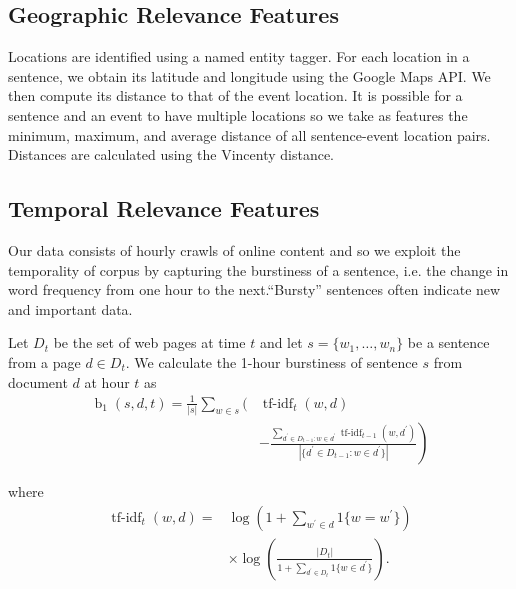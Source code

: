 \documentclass{sig-alternate} \usepackage{url} \usepackage{color}
\begin{document}

\subsection{Geographic Relevance Features}

Locations are identified using a named entity tagger. For each location in a
sentence, we obtain its latitude and longitude using the Google Maps API.  We
then compute its distance to that of the event location.  It is possible for a
sentence and an event to have multiple locations so we take as features the
minimum, maximum, and average distance of all sentence-event location pairs.
Distances are calculated using the Vincenty distance.

\subsection{Temporal Relevance Features}

Our data consists of hourly crawls of online content and so we exploit the
temporality of corpus by capturing the burstiness of a sentence, i.e.  the
change in word frequency from one hour to the next.``Bursty'' sentences often
indicate new and important data. 

Let $D_t$ be the set of web pages at time $t$ and let $s = \{w_1,\ldots,
w_n\}$ be a sentence from a page $d \in D_t$.  We calculate the 1-hour
burstiness of sentence $s$ from document $d$ at hour $t$  as \begin{align*}
\operatorname{b}_1(s,d,t) = \frac{1}{|s|} \sum_{w \in s} \Bigg( &
\operatorname{tf-idf}_t(w,d)  \\ & \left. - \frac{\sum_{d^\prime \in D_{t-1}:
w \in d^\prime } \operatorname{tf-idf}_{t-1}(w,d^\prime)}{|\{d^\prime \in
D_{t-1}: w \in d^\prime\}|} \right) \end{align*}

where \begin{align*} \operatorname{tf-idf}_t(w,d) =&
\log\left(1+\sum_{w^\prime \in d}1\{w=w^\prime\}  \right)\\ & \times
\log\left(\frac{|D_t|}{1 + \sum_{d^\prime \in D_t}1\{w \in d^\prime\}}\right).
\end{align*}
\end{document}

